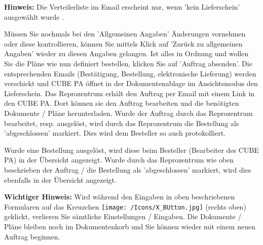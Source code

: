 \begin{figure}[H]
\end{figure}

\textbf{Hinweis:} Die Verteilerliste im Email erscheint nur, wenn 'kein Lieferschein' ausgewählt wurde .

\vspace{\baselineskip}

Müssen Sie nochmals bei den 'Allgemeinen Angaben' Änderungen vornehmen oder diese kontrollieren, können Sie mittels Klick auf 'Zurück zu allgemeinen Angaben' wieder zu diesen Angaben gelangen. Ist alles in Ordnung und wollen Sie die Pläne wie nun definiert bestellen, klicken Sie auf 'Auftrag absenden'. Die entsprechenden Emails (Bestätigung, Bestellung, elektronische Lieferung) werden verschickt und CUBE PA öffnet in der Dokumentenablage im Ansichtsmodus den Lieferschein. Das Reprozentrum erhält den Auftrag per Email mit einem Link in den CUBE PA. Dort können sie den Auftrag bearbeiten und die benötigten Dokumente / Pläne herunterladen. Wurde der Auftrag durch das Reprozentrum bearbeitet, resp. ausgelöst, wird durch das Reprozentrum die Bestellung als 'abgeschlossen' markiert. Dies wird dem Besteller so auch protokolliert.

\vspace{\baselineskip}

Wurde eine Bestellung ausgelöst, wird diese beim Besteller (Bearbeiter des CUBE PA) in der Übersicht angezeigt. Wurde durch das Reprozentrum wie oben beschrieben der Auftrag / die Bestellung als 'abgeschlossen' markiert, wird dies ebenfalls in der Übersicht angezeigt.

\vspace{\baselineskip}

\textbf{Wichtiger Hinweis:} Wird während den Eingaben in oben beschriebenen Formularen auf das Kreuzchen \texttt{[image: /Icons/X\_BUtton.jpg]} (rechts oben) geklickt, verlieren Sie sämtliche Einstellungen / Eingaben. Die Dokumente / Pläne bleiben noch im Dokumentenkorb und Sie können wieder mit einem neuen Auftrag beginnen.

